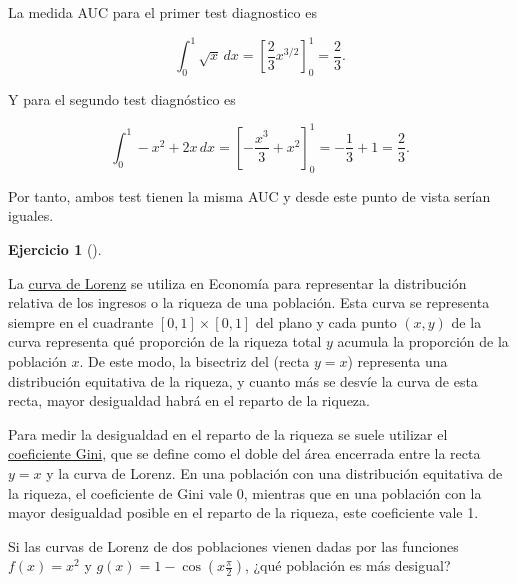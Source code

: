 \documentclass[
  spanish,
  a4paper,
]{scrreport}
\theoremstyle{definition}
\newtheorem{exercise}{Ejercicio}[chapter]
\theoremstyle{remark}
\begin{document}
\begin{tcolorbox}[enhanced jigsaw, arc=.35mm, bottomrule=.15mm, bottomtitle=1mm, breakable, colback=white, colbacktitle=quarto-callout-tip-color!10!white, colframe=quarto-callout-tip-color-frame, coltitle=black, left=2mm, leftrule=.75mm, opacityback=0, opacitybacktitle=0.6, rightrule=.15mm, title=\textcolor{quarto-callout-tip-color}{\faLightbulb}\hspace{0.5em}{Solución}, titlerule=0mm, toprule=.15mm, toptitle=1mm]

La medida AUC para el primer test diagnostico es

\[
\int_0^1 \sqrt{x}\,dx = \left[\frac{2}{3}x^{3/2}\right]_0^1 = \frac{2}{3}.
\]

Y para el segundo test diagnóstico es

\[
\int_0^1 -x^2+2x\,dx = \left[-\frac{x^3}{3}+x^2\right]_0^1 = -\frac{1}{3} + 1 = \frac{2}{3}.
\]

Por tanto, ambos test tienen la misma AUC y desde este punto de vista
serían iguales.

\end{tcolorbox}

\begin{exercise}[]\protect\hypertarget{exr-gini}{}\label{exr-gini}

La \href{https://es.wikipedia.org/wiki/Curva_de_Lorenz}{curva de Lorenz}
se utiliza en Economía para representar la distribución relativa de los
ingresos o la riqueza de una población. Esta curva se representa siempre
en el cuadrante \([0,1]\times [0,1]\) del plano y cada punto \((x,y)\)
de la curva representa qué proporción de la riqueza total \(y\) acumula
la proporción de la población \(x\). De este modo, la bisectriz del
(recta \(y=x\)) representa una distribución equitativa de la riqueza, y
cuanto más se desvíe la curva de esta recta, mayor desigualdad habrá en
el reparto de la riqueza.

Para medir la desigualdad en el reparto de la riqueza se suele utilizar
el \href{https://es.wikipedia.org/wiki/Coeficiente_de_Gini}{coeficiente
Gini}, que se define como el doble del área encerrada entre la recta
\(y=x\) y la curva de Lorenz. En una población con una distribución
equitativa de la riqueza, el coeficiente de Gini vale 0, mientras que en
una población con la mayor desigualdad posible en el reparto de la
riqueza, este coeficiente vale 1.

Si las curvas de Lorenz de dos poblaciones vienen dadas por las
funciones \(f(x)=x^2\) y \(g(x)=1-\cos\left(x\frac{\pi}{2}\right)\),
¿qué población es más desigual?

\end{exercise}
\end{document}
